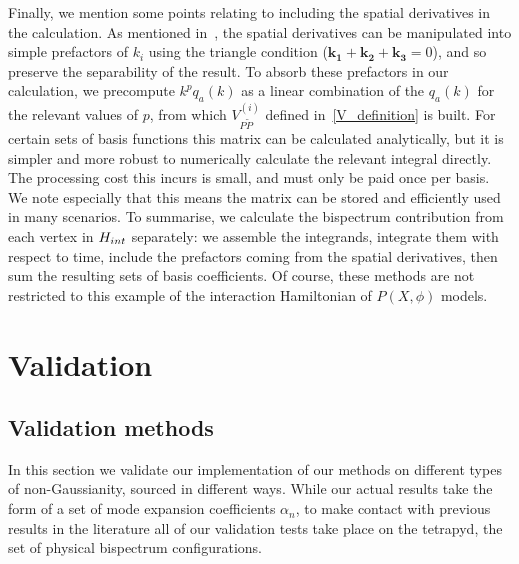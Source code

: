 Finally, we mention some points relating to including the spatial derivatives in
the calculation.
As mentioned in~\cite{Funakoshi}, the spatial derivatives
can be manipulated into simple prefactors of $k_i$ using the
triangle condition ($\mathbf{k_1}+\mathbf{k_2}+\mathbf{k_3}=0$),
and so preserve the separability of the result.
To absorb these prefactors in our calculation, we precompute
$k^{p}q_a(k)$ as a linear combination of the $q_a(k)$ for the
relevant values of $p$,
from which $V^{(i)}_{P\tilde{P}}$ defined in~\eqref{V_definition} is built.
For certain sets of basis functions this matrix can be calculated analytically,
but it is simpler and more robust to numerically calculate the relevant integral directly.
The processing cost this incurs is small, and must only be
paid once per basis. We note especially that this means the matrix can
be stored and efficiently used in many scenarios.
To summarise,
we calculate the bispectrum contribution from each vertex in $H_{int}$ separately:
we assemble the integrands, integrate them with respect to time,
include the prefactors coming from the spatial derivatives,
then sum the resulting sets of basis coefficients.
Of course, these methods are not restricted to this example of
the interaction Hamiltonian of $P(X,\phi)$ models.


\section{Validation}\label{sec:validation}
\subsection{Validation methods}\label{sec:validation_methods}
In this section we validate our implementation of our methods
on different types of non-Gaussianity, sourced in different ways.
While our actual results take the form of a set of mode expansion coefficients $\alpha_n$,
to make contact with previous results in the literature
all of our validation tests take place on the tetrapyd,
the set of physical bispectrum configurations.

